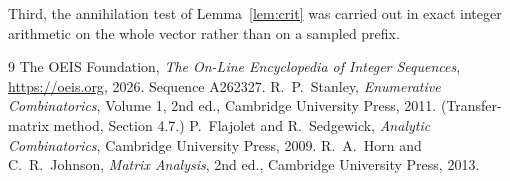 \documentclass[11pt,a4paper]{article}
\theoremstyle{plain}
\theoremstyle{definition}
\begin{document}
Third, the annihilation test of Lemma~\ref{lem:crit} was carried out in exact integer
arithmetic on the whole vector rather than on a sampled prefix.

\begin{thebibliography}{9}
 The OEIS Foundation, \emph{The On-Line Encyclopedia of Integer
Sequences}, \url{https://oeis.org}, 2026. Sequence A262327.
 R.~P.~Stanley, \emph{Enumerative Combinatorics}, Volume 1, 2nd ed.,
Cambridge University Press, 2011. (Transfer-matrix method, Section 4.7.)
 P.~Flajolet and R.~Sedgewick, \emph{Analytic Combinatorics}, Cambridge
University Press, 2009.
 R.~A.~Horn and C.~R.~Johnson, \emph{Matrix Analysis}, 2nd ed., Cambridge
University Press, 2013.
\end{thebibliography}
\end{document}
